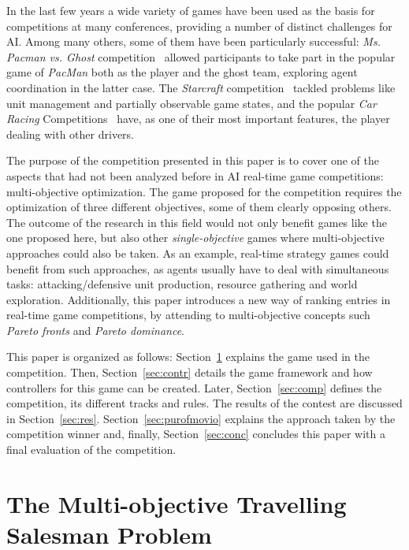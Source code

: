 \documentclass[conference]{IEEEtran}
\begin{document}
In the last few years a wide variety of games have been used as the basis for competitions at many conferences, providing a number of distinct challenges for AI. Among many others, some of them have been particularly successful: \textit{Ms. Pacman vs. Ghost} competition~\cite{Philipp2011} allowed participants to take part in the popular game of \textit{PacMan} both as the player and the ghost team, exploring agent coordination in the latter case. The \textit{Starcraft} competition~\cite{Weber2011} tackled problems like unit management and partially observable game states, and the popular \textit{Car Racing} Competitions~\cite{Loiacono2010} have, as one of their most important features, the player dealing with other drivers.

The purpose of the competition presented in this paper is to cover one of the aspects that had not been analyzed before in AI real-time game competitions: multi-objective optimization. The game proposed for the competition requires the optimization of three different objectives, some of them clearly opposing others. The outcome of the research in this field would not only benefit games like the one proposed here, but also other \textit{single-objective} games where multi-objective approaches could also be taken. As an example, real-time strategy games could benefit from such approaches, as agents usually have to deal with simultaneous tasks: attacking/defensive unit production, resource gathering and world exploration. Additionally, this paper introduces a new way of ranking entries in real-time game competitions, by attending to multi-objective concepts such \textit{Pareto fronts} and \textit{Pareto dominance}.

This paper is organized as follows: Section~\ref{sec:moptsp} explains the game used in the competition. Then, Section~\ref{sec:contr} details the game framework and how controllers for this game can be created. Later, Section~\ref{sec:comp} defines the competition, its different tracks and rules. The results of the contest are discussed in Section~\ref{sec:res}. Section~\ref{sec:purofmovio} explains the approach taken by the competition winner and, finally, Section~\ref{sec:conc} concludes this paper with a final evaluation of the competition.

\section{The Multi-objective Travelling Salesman Problem} \label{sec:moptsp}
\end{document}
